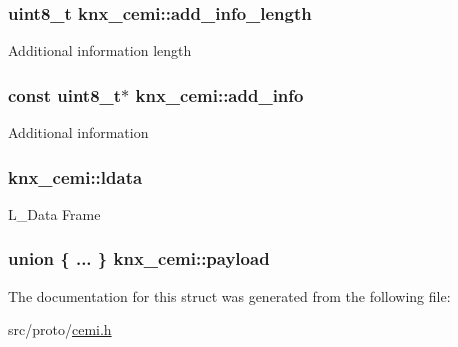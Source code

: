 \subsubsection[{\texorpdfstring{add\+\_\+info\+\_\+length}{add_info_length}}]{\setlength{\rightskip}{0pt plus 5cm}uint8\+\_\+t knx\+\_\+cemi\+::add\+\_\+info\+\_\+length}\hypertarget{structknx__cemi_a05fd38c4fb0b7bd6a8d61c802f1618b7}{}\label{structknx__cemi_a05fd38c4fb0b7bd6a8d61c802f1618b7}
Additional information length 
\subsubsection[{\texorpdfstring{add\+\_\+info}{add_info}}]{\setlength{\rightskip}{0pt plus 5cm}const uint8\+\_\+t$\ast$ knx\+\_\+cemi\+::add\+\_\+info}\hypertarget{structknx__cemi_a3b204edb6ecc8a54ee031eb63c39d277}{}\label{structknx__cemi_a3b204edb6ecc8a54ee031eb63c39d277}
Additional information 
\subsubsection[{\texorpdfstring{ldata}{ldata}}]{ knx\+\_\+cemi\+::ldata}\hypertarget{structknx__cemi_a1ea2d0836b3d335119fee3c82e27e12e}{}\label{structknx__cemi_a1ea2d0836b3d335119fee3c82e27e12e}
L\+\_\+\+Data Frame 
\subsubsection[{\texorpdfstring{payload}{payload}}]{\setlength{\rightskip}{0pt plus 5cm}union \{ ... \}   knx\+\_\+cemi\+::payload}\hypertarget{structknx__cemi_a5a5e3f227b32d442cd5c2a8e69e8134b}{}\label{structknx__cemi_a5a5e3f227b32d442cd5c2a8e69e8134b}


The documentation for this struct was generated from the following file\+:\begin{DoxyCompactItemize}
\item 
src/proto/\hyperlink{cemi_8h}{cemi.\+h}\end{DoxyCompactItemize}
